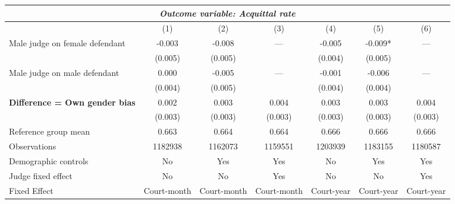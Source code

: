 {
\def\sym#1{\ifmmode^{#1}\else\(^{#1}\)\fi}
\begin{tabular}{l*{6}{c}}
  \hline\hline
\multicolumn{7}{c}{\textit{Outcome variable: Acquittal rate}}\\
\hline
&\multicolumn{1}{c}{(1)}&\multicolumn{1}{c}{(2)}&\multicolumn{1}{c}{(3)}&\multicolumn{1}{c}{(4)}&\multicolumn{1}{c}{(5)}&\multicolumn{1}{c}{(6)}\\
\hline
Male judge on female defendant \hspace{15mm} & -0.003 & -0.008 & --- & -0.005 & -0.009* & --- \\
& (0.005) & (0.005) &  & (0.004) &(0.005) &  \\
Male judge on male defendant \hspace{15mm} & 0.000 & -0.005 & ---& -0.001 & -0.006 & --- \\
& (0.004) & (0.005) &  & (0.004) & (0.004) &  \\
\textbf{Difference = Own gender bias} \hspace{15mm} & 0.002 & 0.003 & 0.004 & 0.003 & 0.003 & 0.004 \\
& (0.003) & (0.003) & (0.003) & (0.003) & (0.003) & (0.003) \\
\hline
Reference group mean & 0.663 & 0.664 & 0.664 & 0.666 & 0.666 & 0.666 \\
Observations & 1182938 & 1162073 & 1159551 & 1203939 & 1183155 & 1180587 \\
Demographic controls & No & Yes & Yes & No & Yes & Yes \\
Judge fixed effect & No & No & Yes & No & No & Yes \\
Fixed Effect & Court-month & Court-month & Court-month & Court-year & Court-year & Court-year \\
\hline\hline
\end{tabular}
}
 

